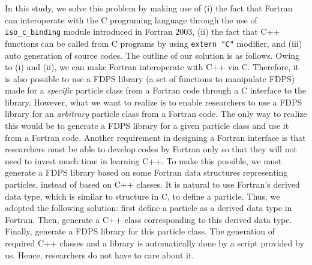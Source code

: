 \documentclass[twocolumn,useamsfonts]{pasj01}
\begin{document}
In this study, we solve this problem by making use of (i) the fact that Fortran can interoperate with the C programing language through the use of  \texttt{iso\_c\_binding} module introduced in Fortran 2003, (ii) the fact that C++ functions can be called from C programs by using \texttt{extern "C"} modifier, and (iii) auto generation of source codes. The outline of our solution is as follows. Owing to (i) and (ii), we can make Fortran interoperate with C++ via C. Therefore, it is also possible to use a FDPS library (a set of functions to manipulate FDPS) made for a \textit{specific} particle class from a Fortran code through a C interface to the library. However, what we want to realize is to enable researchers to use a FDPS library for an \textit{arbitrary} particle class from a Fortran code. The only way to realize this would be to generate a FDPS library for a given particle class and use it from a Fortran code. Another requirement in designing a Fortran interface is that researchers must be able to develop codes by Fortran only so that they will not need to invest much time in learning C++. To make this possible, we must generate a FDPS library based on some Fortran data structures representing particles, instead of based on C++ classes. It is natural to use Fortran's derived data type, which is similar to structure in C, to define a particle. Thus, we adopted the following solution: first define a particle as a derived data type in Fortran. Then, generate a C++ class corresponding to this derived data type. Finally, generate a FDPS library for this particle class. The generation of required C++ classes and a library is automatically done by a script provided by us. Hence, researchers do not have to care about it.
\end{document}
